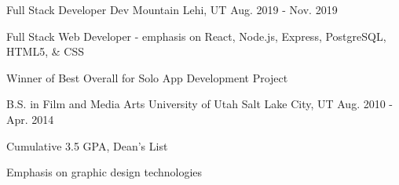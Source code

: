 

\begin{cventries}

  \cventry
  {Full Stack Developer} %
  {Dev Mountain} %
  {Lehi, UT} %
  {Aug. 2019 - Nov. 2019} %
  {
    \begin{cvitems} %
      \item {Full Stack Web Developer - emphasis on React, Node.js, Express, PostgreSQL, HTML5, \& CSS}
      \item {Winner of Best Overall for Solo App Development Project}
    \end{cvitems}
  }

  \cventry
    {B.S. in Film and Media Arts} %
    {University of Utah} %
    {Salt Lake City, UT} %
    {Aug. 2010 - Apr. 2014} %
    {
      \begin{cvitems} %
        \item {Cumulative 3.5 GPA, Dean's List}
        \item {Emphasis on graphic design technologies}
      \end{cvitems}
    }


\end{cventries}
